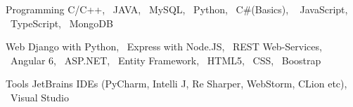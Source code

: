 


\begin{cvskills}

\vspace{2pt}
\cvskill
{Programming} %
{C/C++, ~JAVA, ~MySQL, ~Python, ~C\#(Basics), ~ JavaScript, ~TypeScript, ~MongoDB } %

\vspace{2pt}
\cvskill
{Web} %
{Django with Python, ~Express with Node.JS, ~REST Web-Services, ~Angular 6, ~ASP.NET, ~Entity Framework, \newline ~HTML5, ~CSS, ~Boostrap} %

\vspace{-2pt}
\cvskill
{Tools} %
{JetBrains IDEs (PyCharm, Intelli J, Re Sharper, WebStorm, CLion etc), ~Visual Studio } %


\end{cvskills}